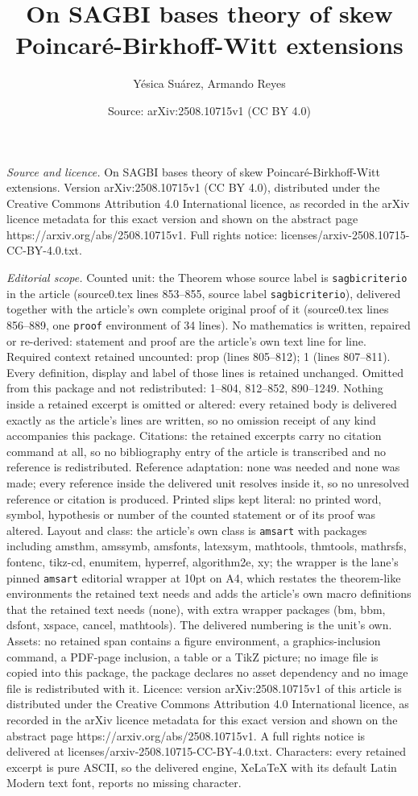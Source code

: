 \documentclass[10pt,a4paper]{amsart}
\title[On SAGBI bases theory of skew Poincar\'e-Birkhoff-Witt exten]{On SAGBI bases theory of skew Poincar\'e-Birkhoff-Witt extensions}
\author{Y\'esica Su\'arez, Armando Reyes}
\date{Source: arXiv:2508.10715v1 (CC BY 4.0)}
\begin{document}
\maketitle

\noindent\emph{Source and licence.} On SAGBI bases theory of skew Poincar\'e-Birkhoff-Witt extensions. Version arXiv:2508.10715v1 (CC BY 4.0), distributed under the Creative Commons Attribution 4.0 International licence, as recorded in the arXiv licence metadata for this exact version and shown on the abstract page https://arxiv.org/abs/2508.10715v1. Full rights notice: licenses/arxiv-2508.10715-CC-BY-4.0.txt.\par\smallskip

\noindent\textit{Editorial scope.} Counted unit: the Theorem whose source label is \texttt{sagbicriterio} in the article (source0.tex lines 853--855, source label \texttt{sagbicriterio}), delivered together with the article's own complete original proof of it (source0.tex lines 856--889, one \texttt{proof} environment of 34 lines). No mathematics is written, repaired or re-derived: statement and proof are the article's own text line for line. Required context retained uncounted: prop (lines 805--812); 1 (lines 807--811). Every definition, display and label of those lines is retained unchanged. Omitted from this package and not redistributed: 1--804, 812--852, 890--1249. Nothing inside a retained excerpt is omitted or altered: every retained body is delivered exactly as the article's lines are written, so no omission receipt of any kind accompanies this package. Citations: the retained excerpts carry no citation command at all, so no bibliography entry of the article is transcribed and no reference is redistributed. Reference adaptation: none was needed and none was made; every reference inside the delivered unit resolves inside it, so no unresolved reference or citation is produced. Printed slips kept literal: no printed word, symbol, hypothesis or number of the counted statement or of its proof was altered. Layout and class: the article's own class is \texttt{amsart} with packages including amsthm, amssymb, amsfonts, latexsym, mathtools, thmtools, mathrsfs, fontenc, tikz-cd, enumitem, hyperref, algorithm2e, xy; the wrapper is the lane's pinned \texttt{amsart} editorial wrapper at 10pt on A4, which restates the theorem-like environments the retained text needs and adds the article's own macro definitions that the retained text needs (none), with extra wrapper packages (bm, bbm, dsfont, xspace, cancel, mathtools). The delivered numbering is the unit's own. Assets: no retained span contains a figure environment, a graphics-inclusion command, a PDF-page inclusion, a table or a TikZ picture; no image file is copied into this package, the package declares no asset dependency and no image file is redistributed with it. Licence: version arXiv:2508.10715v1 of this article is distributed under the Creative Commons Attribution 4.0 International licence, as recorded in the arXiv licence metadata for this exact version and shown on the abstract page https://arxiv.org/abs/2508.10715v1. A full rights notice is delivered at licenses/arxiv-2508.10715-CC-BY-4.0.txt. Characters: every retained excerpt is pure ASCII, so the delivered engine, XeLaTeX with its default Latin Modern text font, reports no missing character.
\end{document}
